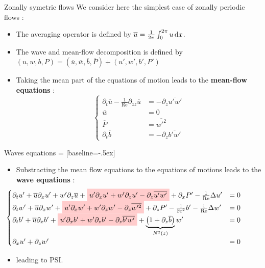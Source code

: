 \documentclass[10pt]{beamer}
\newcommand{\NodeFill}[3]{\tikz[baseline]{\node[fill=#1!20,anchor=base](#2){#3};}}
\begin{document}
\begin{frame}[fragile]{Zonally symetric flows}
  We consider here the simplest case of zonally periodic flows :
  \begin{itemize}
    \item The averaging operator is defined by $\overline{u}=\frac{1}{2\pi}\intop_{0}^{2\pi}u\,\mathrm{d}x$.
    \item The wave and mean\--flow decomposition is defined by $\left(u,w,b,P\right)=\left(\overline{u},\overline{w},\overline{b},\overline{P}\right)+\left(u',w',b',P'\right)$
    \item Taking the mean part of the equations of motion leads to the \textbf{mean\--flow equations} :
    \begin{equation*}
    	\begin{cases}
    	\partial_{t}\overline{u}-\frac{1}{\mathrm{Re}}\partial_{zz}\overline{u} &=- \partial_{z}\overline{u'w'}\\
    	\overline{w}&=0\\
    	\overline{P}&=\overline{w'^{2}}\\
    	\partial_{t}\overline{b}&=-\partial_{z}\overline{b'w'}
    	\end{cases}
    \end{equation*}
  \end{itemize}
\end{frame}

\begin{frame}[fragile]{Waves equations}
   = [baseline=-.5ex]
  \begin{itemize}
  	\item Substracting the mean flow equations to the equations of motions leads to the \textbf{wave equations} :
  	\begin{equation*}
    	\!\!\!\!\!\!\!\!\!\!\!\!\!\!\!\!\!\!\!\!\!\!\!\!\!
    	\begin{cases}
    		\partial_{t}u'+\overline{u}\partial_{x}u'+w'\partial_{z}\overline{u}+\NodeFill{red}{}{$u'\partial_{x}u'+w'\partial_{z}u'-\partial_{z}\overline{u'w'} $} + \partial_{x}P'-\frac{1}{\mathrm{Re}}\Delta u'&=0\\
     		\partial_{t}w'+\overline{u}\partial_{x}w'+\NodeFill{red}{}{$u'\partial_{x}w'+w'\partial_{z}w'-\partial_{z}\overline{w'^{2}}$}+\partial_{z}P'-\frac{1}{\mathrm{Fr}^{2}}b'-\frac{1}{\mathrm{Re}}\Delta w'&=0\\
     		\partial_{t}b'+\overline{u}\partial_{x}b'+\NodeFill{red}{}{$u'\partial_{x}b'+w'\partial_{z}b'-\partial_{z}\overline{b'w'}$}+\underbrace{\left(1+\partial_{z}\overline{b}\right)}_{N^{2}\left(z\right)}w'&=0\\
    		\partial_{x}u'+\partial_{z}w'&=0
   		\end{cases}
  	\end{equation*}
  	\item \NodeFill{red}{}{Non\--linear terms} leading to PSI.
  \end{itemize}
\end{frame}
\end{document}
